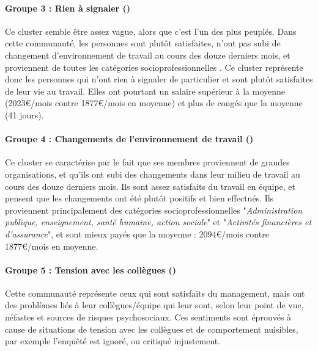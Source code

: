 \documentclass[11pt,fleqn,openany,frenchb]{book} %
\def\NOTE#1{\footnote{MS : #1}}
\begin{document}
\paragraph{Groupe 3 : Rien à signaler (\RAS)\\}
Ce cluster semble être assez vague, alors que c'est l'un des plus peuplés. Dans cette communauté, les personnes sont plutôt satisfaites, n'ont pas subi de changement d'environnement de travail au cours des douze derniers mois, et proviennent de toutes les catégories socioprofessionnelles%
. Ce cluster représente donc les personnes qui n'ont rien à signaler de particulier et sont plutôt satisfaites de leur vie au travail. Elles ont pourtant un salaire supérieur à la moyenne (2023\euro{}/mois contre 1877\euro{}/mois en moyenne) et plus de congés que la moyenne (41 jours).

\paragraph{Groupe 4 : Changements   de   l'environnement   de
travail (\GLOB)\\}
Ce cluster se caractérise par le fait que ses membres proviennent de grandes organisations, et qu'ils ont subi des changements dans leur milieu de travail au cours des douze derniers mois. Ils sont assez satisfaits du travail en équipe, et pensent que les changements ont été plutôt positifs et bien effectués. Ils proviennent principalement des catégories socioprofessionnelles "\textit{Administration publique, enseignement, santé humaine, action sociale}" et "\textit{Activités financières et d'assurance}", et sont mieux payés que la moyenne : 2094\euro{}/mois contre 1877\euro{}/mois en moyenne.

\paragraph{Groupe 5 : Tension avec les collègues (\ENV)\\}
Cette communauté représente ceux qui sont satisfaits du management, mais ont des problèmes liés à leur collègues/équipe qui leur sont, selon leur point de vue, néfastes et sources de risques psychosociaux. Ces sentiments sont éprouvés à cause de situations de tension avec les collègues et de comportement nuisibles, par exemple l'enquêté est ignoré, ou critiqué injustement.
\end{document}

